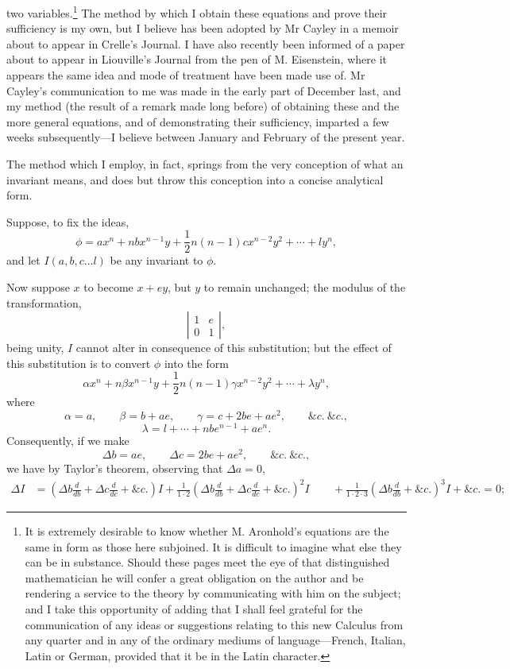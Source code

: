 \documentclass[11pt]{article}
\newcommand{\sourcepage}[1]{\marginpar{\scriptsize p.~#1}}
\begin{document}
\sourcepage{352}
two variables.\footnote{It is extremely desirable to know whether M. Aronhold's equations are the same in form as those here subjoined. It is difficult to imagine what else they can be in substance. Should these pages meet the eye of that distinguished mathematician he will confer a great obligation on the author and be rendering a service to the theory by communicating with him on the subject; and I take this opportunity of adding that I shall feel grateful for the communication of any ideas or suggestions relating to this new Calculus from any quarter and in any of the ordinary mediums of language---French, Italian, Latin or German, provided that it be in the Latin character.} The method by which I obtain these equations and prove their sufficiency is my own, but I believe has been adopted by Mr Cayley in a memoir about to appear in Crelle's Journal. I have also recently been informed of a paper about to appear in Liouville's Journal from the pen of M. Eisenstein, where it appears the same idea and mode of treatment have been made use of. Mr Cayley's communication to me was made in the early part of December last, and my method (the result of a remark made long before) of obtaining these and the more general equations, and of demonstrating their sufficiency, imparted a few weeks subsequently---I believe between January and February of the present year.

The method which I employ, in fact, springs from the very conception of what an invariant means, and does but throw this conception into a concise analytical form.

Suppose, to fix the ideas,
\[
\phi=ax^n+nbx^{n-1}y+\frac12n(n-1)cx^{n-2}y^2+\cdots+ly^n,
\]
and let $I(a,b,c\ldots l)$ be any invariant to $\phi$.

Now suppose $x$ to become $x+ey$, but $y$ to remain unchanged; the modulus of the transformation,
\[
\left|\begin{array}{cc}1&e\\0&1\end{array}\right|,
\]
being unity, $I$ cannot alter in consequence of this substitution; but the effect of this substitution is to convert $\phi$ into the form
\[
\alpha x^n+n\beta x^{n-1}y+\frac12n(n-1)\gamma x^{n-2}y^2+\cdots+\lambda y^n,
\]
where
\[
\alpha=a,
\qquad \beta=b+ae,
\qquad \gamma=c+2be+ae^2,
\qquad \&c.\ \&c.,
\]
\[
\lambda=l+\cdots+nbe^{n-1}+ae^n.
\]
Consequently, if we make
\[
\Delta b=ae,
\qquad \Delta c=2be+ae^2,
\qquad \&c.\ \&c.,
\]
we have by Taylor's theorem, observing that $\Delta a=0$,
\[
\begin{aligned}
\Delta I&=\left(\Delta b\frac{d}{db}+\Delta c\frac{d}{dc}+\&c.\right)I
+\frac1{1\cdot2}\left(\Delta b\frac{d}{db}+\Delta c\frac{d}{dc}+\&c.\right)^2I\
&\quad+\frac1{1\cdot2\cdot3}\left(\Delta b\frac{d}{db}+\&c.\right)^3I+\&c.=0;
\end{aligned}
\]
\end{document}
